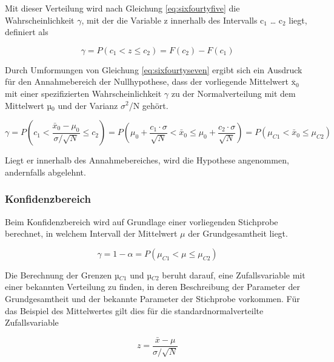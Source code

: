 \noindent Mit dieser Verteilung wird nach Gleichung \eqref{eq:sixfourtyfive} die Wahrscheinlichkeit $\gamma$, mit der die Variable z innerhalb des Intervalls c$_{1}$ {\dots} c$_{2}$ liegt, definiert als

\begin{equation}\label{eq:sixfourtyseven}
\gamma =P\left(c_{1} <z\le c_{2} \right)=F(c_{2})-F(c_{1})
\end{equation}

\noindent Durch Umformungen von Gleichung \eqref{eq:sixfourtyseven} ergibt sich ein Ausdruck f\"{u}r den Annahmebereich der Nullhypothese, dass der vorliegende Mittelwert ${\overline{\mathrm{x}}}_0$ mit einer spezifizierten Wahrscheinlichkeit $\gamma$ zu der Normalverteilung mit dem Mittelwert µ$_{0}$ und der Varianz $\sigma^{2}$/N geh\"{o}rt.

\begin{equation}\label{eq:sixfourtyeight}
\gamma =P\left(c_{1} <\dfrac{\bar{x}_{0} -\mu _{0}}{\sigma /\sqrt{N}} \le c_{2} \right)=P\left(\mu _{0} +\dfrac{c_{1} \cdot \sigma }{\sqrt{N} } <\bar{x}_{0} \le \mu _{0} +\dfrac{c_{2} \cdot \sigma }{\sqrt{N}} \right)=P\left(\mu _{C1} <\bar{x}_{0} \le \mu _{C2} \right)
\end{equation}

\noindent Liegt er innerhalb des Annahmebereiches, wird die Hypothese angenommen, andernfalls abgelehnt.

\subsubsection{Konfidenzbereich}

\noindent Beim Konfidenzbereich wird auf Grundlage einer vorliegenden Stichprobe berechnet, in welchem Intervall der Mittelwert $\mu$ der Grundgesamtheit liegt. 

\begin{equation}\label{eq:sixfourtynine}
\gamma =1-\alpha =P\left(\mu _{C1} <\mu \le \mu _{C2} \right)
\end{equation}

\noindent Die Berechnung der Grenzen µ$_{C1}$ und µ$_{C2}$ beruht darauf, eine Zufallsvariable mit einer bekannten Verteilung zu finden, in deren Beschreibung der Parameter der Grundgesamtheit und der bekannte Parameter der Stichprobe vorkommen. F\"{u}r das Beispiel des Mittelwertes gilt dies f\"{u}r die standardnormalverteilte Zufallsvariable

\begin{equation}\label{eq:sixfifty}
z=\dfrac{\bar{x}-\mu}{\sigma /\sqrt{N}}
\end{equation}

